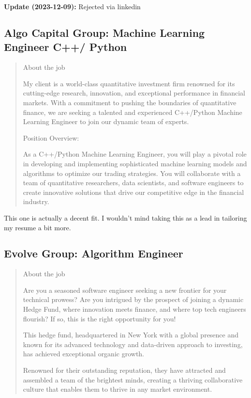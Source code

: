 \documentclass[
	letterpaper, %
	12pt, %
]{CSSullivanBusinessReport}
\begin{document}
\textbf{Update (2023-12-09):} Rejected via linkedin

\subsection[Algo Capital Group]{Algo Capital Group: Machine Learning Engineer C++/ Python }

\begin{quote}
	About the job
	
	My client is a world-class quantitative investment firm renowned for its cutting-edge research, innovation, and exceptional performance in financial markets. With a commitment to pushing the boundaries of quantitative finance, we are seeking a talented and experienced C++/Python Machine Learning Engineer to join our dynamic team of experts.

	Position Overview:

	As a C++/Python Machine Learning Engineer, you will play a pivotal role in developing and implementing sophisticated machine learning models and algorithms to optimize our trading strategies. You will collaborate with a team of quantitative researchers, data scientists, and software engineers to create innovative solutions that drive our competitive edge in the financial industry.

\end{quote}

This one is actually a decent fit. I wouldn't mind taking this as a lead in tailoring my resume a bit more. 

\subsection[Evolve Group]{Evolve Group: Algorithm Engineer}

\begin{quote}
	About the job
	
	Are you a seasoned software engineer seeking a new frontier for your technical prowess? Are you intrigued by the prospect of joining a dynamic Hedge Fund, where innovation meets finance, and where top tech engineers flourish? If so, this is the right opportunity for you!

	This hedge fund, headquartered in New York with a global presence and known for its advanced technology and data-driven approach to investing, has achieved exceptional organic growth.

	Renowned for their outstanding reputation, they have attracted and assembled a team of the brightest minds, creating a thriving collaborative culture that enables them to thrive in any market environment.

\end{quote}
\end{document}
